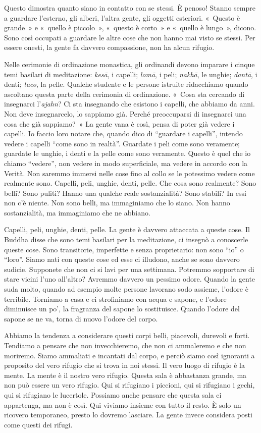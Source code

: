 Questo dimostra quanto siano in contatto con se stessi. È penoso! Stanno
sempre a guardare l'esterno, gli alberi, l'altra gente, gli oggetti
esteriori. «~Questo è grande~» e «~quello è piccolo~», «~questo è
corto~» e «~quello è lungo~», dicono. Sono così occupati a guardare le
altre cose che non hanno mai visto se stessi. Per essere onesti, la
gente fa davvero compassione, non ha alcun rifugio.

Nelle cerimonie di ordinazione monastica, gli ordinandi devono imparare
i cinque temi basilari di meditazione: \emph{kesā}, i capelli;
\emph{lomā}, i peli; \emph{nakhā}, le unghie; \emph{dantā}, i denti;
\emph{taco}, la pelle. Qualche studente e le persone istruite
ridacchiamo quando ascoltano questa parte della cerimonia di
ordinazione. «~Cosa sta cercando di insegnarci l'\emph{ajahn}? Ci sta
insegnando che esistono i capelli, che abbiamo da anni. Non deve
insegnarcelo, lo sappiamo già. Perché preoccuparsi di insegnarci una
cosa che già sappiamo?~» La gente vana è così, pensa di poter già vedere
i capelli. Io faccio loro notare che, quando dico di ``guardare i
capelli'', intendo vedere i capelli ``come sono in realtà''. Guardate i
peli come sono veramente; guardate le unghie, i denti e la pelle come
sono veramente. Questo è quel che io chiamo ``vedere'', non vedere in
modo superficiale, ma vedere in accordo con la Verità. Non saremmo
immersi nelle cose fino al collo se le potessimo vedere come realmente
sono. Capelli, peli, unghie, denti, pelle. Che cosa sono realmente? Sono
belli? Sono puliti? Hanno una qualche reale sostanzialità? Sono stabili?
In essi non c'è niente. Non sono belli, ma immaginiamo che lo siano. Non
hanno sostanzialità, ma immaginiamo che ne abbiano.

Capelli, peli, unghie, denti, pelle. La gente è davvero attaccata a
queste cose. Il Buddha disse che sono temi basilari per la meditazione,
ci insegnò a conoscerle queste cose. Sono transitorie, imperfette e
senza proprietario: non sono ``io'' o ``loro''. Siamo nati con queste
cose ed esse ci illudono, anche se sono davvero sudicie. Supponete che
non ci si lavi per una settimana. Potremmo sopportare di stare vicini
l'uno all'altro? Avremmo davvero un pessimo odore. Quando la gente suda
molto, quando ad esempio molte persone lavorano sodo assieme, l'odore è
terribile. Torniamo a casa e ci strofiniamo con acqua e sapone, e
l'odore diminuisce un po', la fragranza del sapone lo sostituisce.
Quando l'odore del sapone se ne va, torna di nuovo l'odore del corpo.

Abbiamo la tendenza a considerare questi corpi belli, piacevoli,
durevoli e forti. Tendiamo a pensare che non invecchieremo, che non ci
ammaleremo e che non moriremo. Siamo ammaliati e incantati dal corpo, e
perciò siamo così ignoranti a proposito del vero rifugio che si trova in
noi stessi. Il vero luogo di rifugio è la mente. La mente è il nostro
vero rifugio. Questa sala è abbastanza grande, ma non può essere un vero
rifugio. Qui si rifugiano i piccioni, qui si rifugiano i gechi, qui si
rifugiano le lucertole. Possiamo anche pensare che questa sala ci
appartenga, ma non è così. Qui viviamo insieme con tutto il resto. È
solo un ricovero temporaneo, presto lo dovremo lasciare. La gente invece
considera posti come questi dei rifugi.

